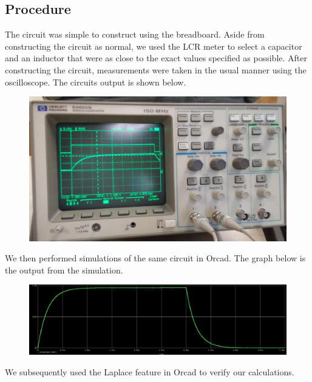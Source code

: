 \documentclass[11pt]{article}
\begin{document}
	\subsection*{Procedure}
	The circuit was simple to construct using the breadboard. Aside from constructing the circuit as normal, we used the LCR meter to select a capacitor and an inductor that were as close to the exact values specified as possible. After constructing the circuit, measurements were taken in the usual manner using the oscilloscope. The circuits output is shown below.
		\begin{figure}[H]
		\centering
		\includegraphics[width=5in]{images/oscilloscope_transfer.jpg}
		\end{figure}
	We then performed simulations of the same circuit in Orcad. The graph below is the output from the simulation.
		\begin{figure}[H]
		\centering
		\includegraphics[width=6in]{images/simulated_curve.png}
		\end{figure}

	We subsequently used the Laplace feature in Orcad to verify our calculations. 
	
\end{document}
